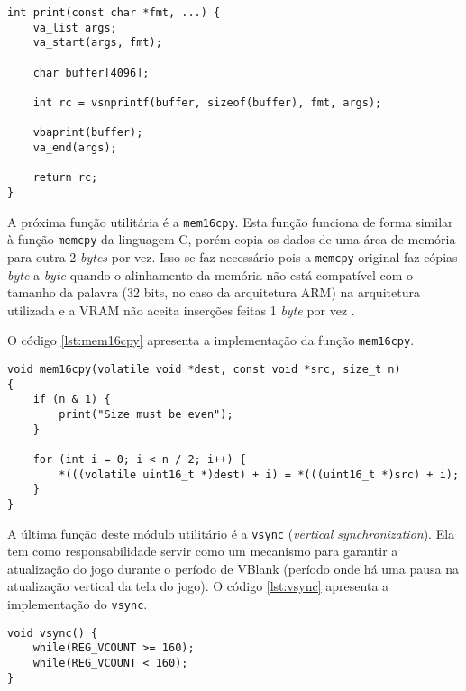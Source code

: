 \begin{lstlisting}[caption={Implementação da função \texttt{print}},label={lst:utilsprint}]
int print(const char *fmt, ...) {
    va_list args;
    va_start(args, fmt);

    char buffer[4096];

    int rc = vsnprintf(buffer, sizeof(buffer), fmt, args);

    vbaprint(buffer);
    va_end(args);

    return rc;
}
\end{lstlisting}

A próxima função utilitária é a \texttt{mem16cpy}. Esta função funciona de forma similar à função \texttt{memcpy} da linguagem C, porém copia os dados de uma área de memória para outra 2 \textit{bytes} por vez. Isso se faz necessário pois a \texttt{memcpy} original faz cópias \textit{byte} a \textit{byte} quando o alinhamento da memória não está compatível com o tamanho da palavra (32 bits, no caso da arquitetura ARM) na arquitetura utilizada e a VRAM não aceita inserções feitas 1 \textit{byte} por vez \cite{coranac}.

O código \ref{lst:mem16cpy} apresenta a implementação da função \texttt{mem16cpy}.

\begin{lstlisting}[caption={Implementação da função \texttt{mem16cpy}},label={lst:mem16cpy}]
void mem16cpy(volatile void *dest, const void *src, size_t n)
{
    if (n & 1) {
        print("Size must be even");
    }

    for (int i = 0; i < n / 2; i++) {
        *(((volatile uint16_t *)dest) + i) = *(((uint16_t *)src) + i);
    }
}
\end{lstlisting}

A última função deste módulo utilitário é a \texttt{vsync} (\textit{vertical synchronization}). Ela tem como responsabilidade servir como um mecanismo para garantir a atualização do jogo durante o período de VBlank (período onde há uma pausa na atualização vertical da tela do jogo). O código \ref{lst:vsync} apresenta a implementação do \texttt{vsync}.

\begin{lstlisting}[caption={Implementação da função \texttt{vsync}},label={lst:vsync}]
void vsync() {
    while(REG_VCOUNT >= 160);
    while(REG_VCOUNT < 160);
}
\end{lstlisting}
